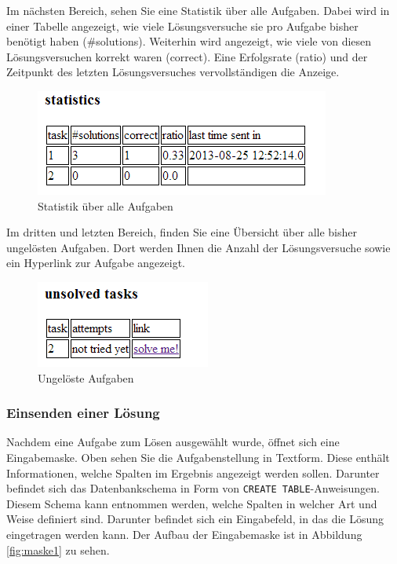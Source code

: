 \documentclass[12pt]{scrreprt}
\theoremstyle{remark}
\begin{document}
Im nächsten Bereich, sehen Sie eine Statistik über alle Aufgaben. Dabei wird in einer Tabelle angezeigt, wie viele Lösungsversuche sie pro Aufgabe bisher benötigt haben (\#solutions). Weiterhin wird angezeigt, wie viele von diesen Lösungsversuchen korrekt waren (correct). Eine Erfolgsrate (ratio) und der Zeitpunkt des letzten Lösungsversuches vervollständigen die Anzeige.

\begin{figure}[H]
\centering
\includegraphics[scale=0.7]{Bilder/screen_user_2.png}
\caption{Statistik über alle Aufgaben}
\end{figure}

Im dritten und letzten Bereich, finden Sie eine Übersicht über alle bisher ungelösten Aufgaben. Dort werden Ihnen die Anzahl der Lösungsversuche sowie ein Hyperlink zur Aufgabe angezeigt.

\begin{figure}[H]
\centering
\includegraphics[scale=0.7]{Bilder/screen_user_3.png}
\caption{Ungelöste Aufgaben}
\end{figure}

\subsubsection{Einsenden einer Lösung}

Nachdem eine Aufgabe zum Lösen ausgewählt wurde, öffnet sich eine Eingabemaske. Oben sehen Sie die Aufgabenstellung in Textform. Diese enthält Informationen, welche Spalten im Ergebnis angezeigt werden sollen. Darunter befindet sich das Datenbankschema in Form von \verb|CREATE TABLE|-Anweisungen. Diesem Schema kann entnommen werden, welche Spalten in welcher Art und Weise definiert sind. Darunter befindet sich ein Eingabefeld, in das die Lösung eingetragen werden kann. Der Aufbau der Eingabemaske ist in Abbildung \ref{fig:maske1} zu sehen.
\end{document}
